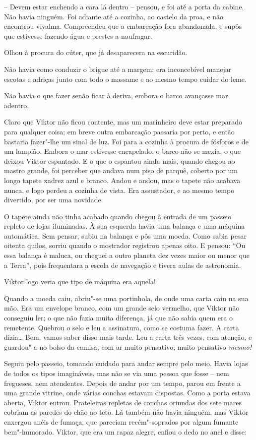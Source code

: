 -- Devem estar enchendo a cara lá dentro -- pensou, e foi até a porta da
cabine. Não havia ninguém. Foi adiante até a cozinha, ao castelo da
proa, e não encontrou vivalma. Compreendeu que a embarcação fora
abandonada, e supôs que estivesse fazendo água e prestes a naufragar.

Olhou à procura do cúter, que já desaparecera na escuridão. 

Não havia como conduzir o brigue até a margem; era inconcebível manejar
escotas e adriças junto com todo o massame e ao mesmo tempo cuidar do
leme. 

Não havia o que fazer senão ficar à deriva, embora o barco avançasse mar
adentro.

Claro que Viktor não ficou contente, mas um marinheiro deve estar
preparado para qualquer coisa; em breve outra embarcação passaria por
perto, e então bastaria fazer"-lhe um sinal de luz. Foi para a cozinha
à procura de fósforos e de um lampião. Embora o mar estivesse
encapelado, o barco não se mexia, o que deixou Viktor espantado. E o
que o espantou ainda mais, quando chegou ao mastro grande, foi perceber
que andava num piso de parquê, coberto por um longo tapete xadrez azul
e branco. Andou e andou, mas o tapete não acabava nunca, e logo perdeu
a cozinha de vista. Era assustador, e ao mesmo tempo divertido, por ser
uma novidade.

O tapete ainda não tinha acabado quando chegou à entrada de um passeio
repleto de lojas iluminadas. À sua esquerda havia uma balança e uma
máquina automática. Sem pensar, subiu na balança e pôs uma moeda. Como
sabia pesar oitenta quilos, sorriu quando o mostrador registrou apenas
oito. E pensou: ``Ou essa balança é maluca, ou cheguei a outro planeta
dez vezes maior ou menor que a Terra'', pois frequentara a escola de
navegação e tivera aulas de astronomia.

Viktor logo veria que tipo de máquina era aquela! 

Quando a moeda caiu, abriu"-se uma portinhola, de onde uma carta caiu
na sua mão. Era um envelope branco, com um grande selo vermelho, que
Viktor não conseguiu ler; o que não fazia muita diferença, já que não
sabia quem era o remetente. Quebrou o selo e leu a assinatura, como se
costuma fazer. A carta dizia\ldots{} Bem, vamos saber disso mais tarde. Leu
a carta três vezes, com atenção, e guardou"-a no bolso da camisa, com
ar muito pensativo; muito pensativo \textit{mesmo!}

Seguiu pelo passeio, tomando cuidado para andar sempre pelo meio. Havia
lojas de todos os tipos imagináveis, mas não se via uma pessoa que
fosse -- nem fregueses, nem atendentes. Depois de andar por um tempo,
parou em frente a uma grande vitrine, onde várias conchas estavam
dispostas. Como a porta estava aberta, Viktor entrou. Prateleiras
repletas de conchas oriundas dos sete mares cobriam as paredes do chão
ao teto. Lá também não havia ninguém, mas Viktor enxergou anéis de
fumaça, que pareciam recém"-soprados por algum fumante bem"-humorado.
Viktor, que era um rapaz alegre, enfiou o dedo no anel e disse:

